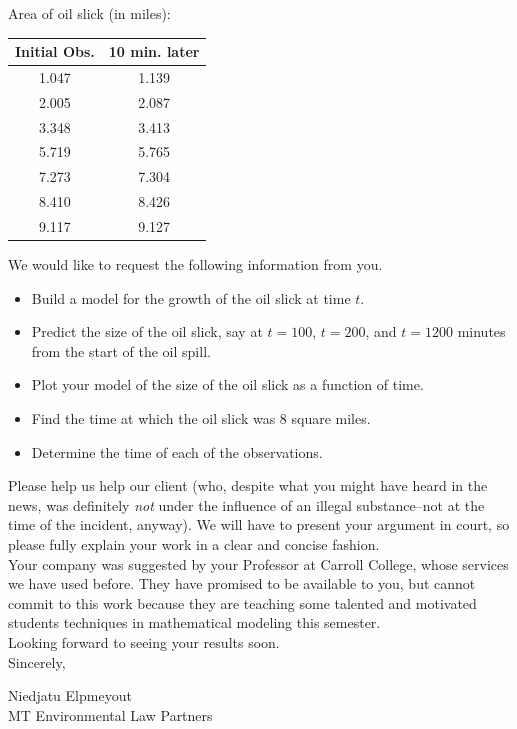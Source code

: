\begin{lab}
\begin{center} Area of oil slick (in miles):\\
\begin{tabular}{|c|c|}
\hline
Initial Obs.	& 10 min. later\\
\hline \hline
	1.047	& 1.139\\
	\hline
	2.005	& 2.087 \\
	\hline
	3.348	& 3.413\\
	\hline
	5.719	& 5.765\\
	\hline
	7.273	& 7.304\\
	\hline
	8.410	& 8.426\\
	\hline
	9.117	& 9.127\\
	\hline
\end{tabular}
\end{center}
\vspace{1cm}

\noindent  We would like to request the following information from you.
	\begin{itemize}
	\item  Build a model for the growth of the oil slick at time $t.$
	\item  Predict the size of the oil slick, say at $t = 100$, $t = 200$, and $t = 1200$ minutes from the start of the 
			oil spill.
	\item  Plot your model of the size of the oil slick as a function of time.
	\item  Find the time at which the oil slick was 8 square miles.
	\item Determine the time of each of the observations.\\ 
	\end{itemize}

\noindent  Please help us help our client (who, despite what you might have heard in the news, was definitely {\it not} under the influence of an illegal substance--not at the time of the incident, anyway).  We will have to present your argument in court, so please fully explain your work in a clear and concise fashion.\\

\noindent  Your company was suggested by your Professor at Carroll College, whose
services we have used before.  They have promised to be available to you, but cannot
commit to this work because they are teaching some talented and motivated students techniques
in mathematical modeling this semester. \\

\noindent Looking forward to seeing your results soon.\\

\noindent Sincerely,\\ \vspace{0.5cm}

\noindent Niedjatu Elpmeyout\\
MT Environmental Law Partners
\end{lab}





